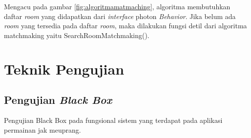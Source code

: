 \newpage
Mengacu pada gambar \ref{fig:algoritmamatmaching}, algoritma membutuhkan daftar \textit{room} yang didapatkan dari \textit{interface} photon \textit{Behavior}. Jika belum ada \textit{room} yang tersedia pada daftar \textit{room}, maka dilakukan fungsi detil dari algoritma matchmaking yaitu SearchRoomMatchmaking(). 

    
    
    

        \section{Teknik Pengujian}
\subsection{Pengujian \textit{Black Box}}
Pengujian Black Box pada fungsional sistem yang terdapat pada aplikasi permainan jak meuprang.

